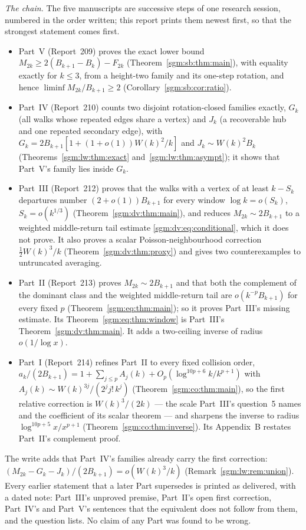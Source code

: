 \documentclass[11pt,letterpaper]{article}
\theoremstyle{remark}\newtheorem{remark}[theorem]{Remark}
\theoremstyle{definition}\newtheorem{definition}[theorem]{Definition}
\begin{document}
\emph{The chain.} The five manuscripts are successive steps of one
research session, numbered in the order written; this report prints them
newest first, so that the strongest statement comes first.
\begin{itemize}
\item Part~V (Report~209) proves the exact lower bound
$M_{2k}\ge2(B_{k+1}-B_k)-F_{2k}$ (Theorem~\ref{sgm:sb:thm:main}), with
equality exactly for $k\le3$, from a height-two family and its one-step
rotation, and hence $\liminf M_{2k}/B_{k+1}\ge2$
(Corollary~\ref{sgm:sb:cor:ratio}).
\item Part~IV (Report~210) counts two disjoint rotation-closed families
exactly, $G_k$ (all walks whose repeated edges share a vertex) and $J_k$
(a recoverable hub and one repeated secondary edge), with
$G_k=2B_{k+1}[1+(1+o(1))W(k)^2/k]$ and $J_k\sim W(k)^2B_k$
(Theorems~\ref{sgm:lw:thm:exact} and~\ref{sgm:lw:thm:asympt}); it shows
that Part~V's family lies inside $G_k$.
\item Part~III (Report~212) proves that the walks with a vertex of at least
$k-S_k$ departures number $(2+o(1))B_{k+1}$ for every window
$\log k=o(S_k)$, $S_k=o(k^{1/3})$ (Theorem~\ref{sgm:dv:thm:main}), and
reduces $M_{2k}\sim2B_{k+1}$ to a weighted middle-return tail estimate
\eqref{sgm:dv:eq:conditional}, which it does not prove. It also proves a
scalar Poisson-neighbourhood correction $\frac12W(k)^3/k$
(Theorem~\ref{sgm:dv:thm:proxy}) and gives two counterexamples to
untruncated averaging.
\item Part~II (Report~213) proves $M_{2k}\sim2B_{k+1}$ and that both the
complement of the dominant class and the weighted middle-return tail are
$o(k^{-p}B_{k+1})$ for every fixed $p$ (Theorem~\ref{sgm:eq:thm:main}); so
it proves Part~III's missing estimate. Its Theorem~\ref{sgm:eq:thm:window}
is Part~III's Theorem~\ref{sgm:dv:thm:main}. It adds a two-ceiling inverse
of radius $o(1/\log x)$.
\item Part~I (Report~214) refines Part~II to every fixed collision order,
$a_k/(2B_{k+1})=1+\sum_{j\le p}A_j(k)+O_p(\log^{10p+6}k/k^{p+1})$ with
$A_j(k)\sim W(k)^{3j}/(2^jj!\,k^j)$ (Theorem~\ref{sgm:co:thm:main}), so
the first relative correction is $W(k)^3/(2k)$ --- the scale Part~III's
question~5 names and the coefficient of its scalar theorem --- and sharpens
the inverse to radius $\log^{10p+5}x/x^{p+1}$
(Theorem~\ref{sgm:co:thm:inverse}). Its Appendix~B restates Part~II's
complement proof.
\end{itemize}
The write adds that Part~IV's families already carry the first correction:
$(M_{2k}-G_k-J_k)/(2B_{k+1})=o(W(k)^3/k)$
(Remark~\ref{sgm:lw:rem:union}). Every earlier statement that a later Part
supersedes is printed as delivered, with a dated note: Part~III's unproved
premise, Part~II's open first correction, Part~IV's and Part~V's sentences
that the equivalent does not follow from them, and the question lists. No
claim of any Part was found to be wrong.
\end{document}

